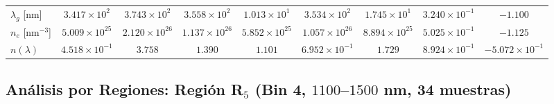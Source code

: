 \documentclass{article}
\begin{document}
\begin{table}[htbp]
\begin{tabular}{@{}lcccccccc@{}}
$\lambda_{g}$ [nm] & $3.417 \times 10^2$ & $3.743 \times 10^2$ & $3.558 \times 10^2$ & $1.013 \times 10^1$ & $3.534 \times 10^2$ & $1.745 \times 10^1$ & $3.240 \times 10^{-1}$ & $-1.100$ \\
$n_{e}$ [nm$^{-3}$] & $5.009 \times 10^{25}$ & $2.120 \times 10^{26}$ & $1.137 \times 10^{26}$ & $5.852 \times 10^{25}$ & $1.057 \times 10^{26}$ & $8.894 \times 10^{25}$ & $5.025 \times 10^{-1}$ & $-1.125$ \\
$n(\lambda)$ & $4.518 \times 10^{-1}$ & $3.758$ & $1.390$ & $1.101$ & $6.952 \times 10^{-1}$ & $1.729$ & $8.924 \times 10^{-1}$ & $-5.072 \times 10^{-1}$ \\
\bottomrule
\end{tabular}
\end{table}

\subsection{An\'alisis por Regiones: Regi\'on R$_5$ (Bin 4, $1100$--$1500$ nm, 34 muestras)}
\end{document}
